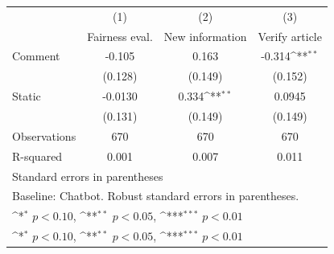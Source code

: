 {
\def\sym#1{\ifmmode^{#1}\else\(^{#1}\)\fi}
\begin{tabular}{l*{3}{c}}
\toprule
                    &\multicolumn{1}{c}{(1)}&\multicolumn{1}{c}{(2)}&\multicolumn{1}{c}{(3)}\\
                    &\multicolumn{1}{c}{Fairness eval.}&\multicolumn{1}{c}{New information}&\multicolumn{1}{c}{Verify article}\\
\midrule
Comment             &      -0.105         &       0.163         &      -0.314\sym{**} \\
                    &     (0.128)         &     (0.149)         &     (0.152)         \\
\addlinespace
Static              &     -0.0130         &       0.334\sym{**} &      0.0945         \\
                    &     (0.131)         &     (0.149)         &     (0.149)         \\
\midrule
Observations        &         670         &         670         &         670         \\
R-squared           &       0.001         &       0.007         &       0.011         \\
\bottomrule
\multicolumn{4}{l}{\footnotesize Standard errors in parentheses}\\
\multicolumn{4}{l}{\footnotesize Baseline: Chatbot. Robust standard errors in parentheses.}\\
\multicolumn{4}{l}{\footnotesize \sym{*} \(p<0.10\), \sym{**} \(p<0.05\), \sym{***} \(p<0.01\)}\\
\multicolumn{4}{l}{\footnotesize \sym{*} \(p<0.10\), \sym{**} \(p<0.05\), \sym{***} \(p<0.01\)}\\
\end{tabular}
}
